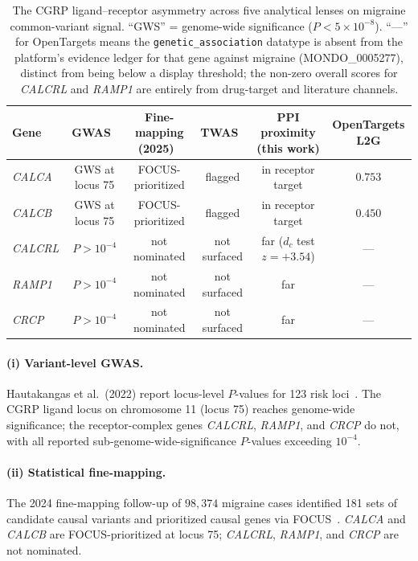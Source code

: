 \documentclass[11pt]{article}
\begin{document}
\begin{table}[h]
\centering
\caption{The CGRP ligand--receptor asymmetry across five analytical lenses on migraine common-variant signal. ``GWS'' = genome-wide significance ($P < 5 \times 10^{-8}$). ``---'' for OpenTargets means the \texttt{genetic\_association} datatype is absent from the platform's evidence ledger for that gene against migraine (MONDO\_0005277), distinct from being below a display threshold; the non-zero overall scores for \textit{CALCRL} and \textit{RAMP1} are entirely from drug-target and literature channels.}
\label{tab:asymmetry}
\small
\begin{tabular}{l c c c c c}
\toprule
Gene & GWAS~\cite{hautakangas_2022_migraine_gwas} & Fine-mapping (2025)~\cite{hautakangas_2025_migraine_finemapping} & TWAS~\cite{ghaffar_2023_migraine_eqtl_twas} & PPI proximity (this work) & OpenTargets L2G \\
\midrule
\textit{CALCA}  & GWS at locus 75 & FOCUS-prioritized & flagged & in receptor target & $\mathbf{0.753}$ \\
\textit{CALCB}  & GWS at locus 75 & FOCUS-prioritized & flagged & in receptor target & $\mathbf{0.450}$ \\
\textit{CALCRL} & $P > 10^{-4}$   & not nominated     & not surfaced & far ($d_c$ test $z = +3.54$) & --- \\
\textit{RAMP1}  & $P > 10^{-4}$   & not nominated     & not surfaced & far                          & --- \\
\textit{CRCP}   & $P > 10^{-4}$   & not nominated     & not surfaced & far                          & --- \\
\bottomrule
\end{tabular}
\end{table}

\paragraph{(i) Variant-level GWAS.} Hautakangas et al.\ (2022) report locus-level $P$-values for 123 risk loci~\cite{hautakangas_2022_migraine_gwas}. The CGRP ligand locus on chromosome 11 (locus 75) reaches genome-wide significance; the receptor-complex genes \textit{CALCRL}, \textit{RAMP1}, and \textit{CRCP} do not, with all reported sub-genome-wide-significance $P$-values exceeding $10^{-4}$.

\paragraph{(ii) Statistical fine-mapping.} The 2024 fine-mapping follow-up of $98{,}374$ migraine cases identified 181 sets of candidate causal variants and prioritized causal genes via FOCUS~\cite{hautakangas_2025_migraine_finemapping}. \textit{CALCA} and \textit{CALCB} are FOCUS-prioritized at locus 75; \textit{CALCRL}, \textit{RAMP1}, and \textit{CRCP} are not nominated.
\end{document}
